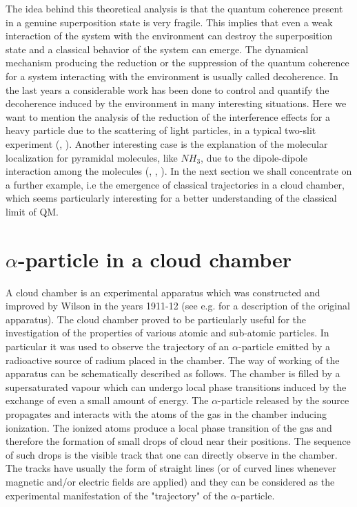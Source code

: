 \documentclass[12pt,reqno]{amsart}
\newcommand{\n}{\relax}
\newcommand{\vs}{\medskip}
\numberwithin{equation}{section}
\begin{document}
\n
The idea behind this theoretical analysis is that the quantum coherence  present in a genuine superposition state is very fragile. This implies that even a weak interaction of the system with the environment can destroy the superposition state and a classical behavior of the system can emerge. The dynamical mechanism producing the reduction or the suppression of the quantum coherence for a system interacting with the environment is usually called decoherence. In the last years a considerable work has been done to control and quantify the decoherence induced by the environment in many interesting situations. Here we want to  mention the analysis of the reduction of the interference effects for a heavy particle due to the scattering of light particles, in a typical  two-slit experiment (\cite{jz}, \cite{hs}). Another  interesting case is the explanation of the molecular localization for  pyramidal molecules, like $NH_3$, due to the dipole-dipole interaction among the molecules (\cite{cj}, \cite{jpt}, \cite{gms}). 
In the next section we shall concentrate on a further example, i.e the emergence of classical trajectories in a cloud chamber, which seems particularly interesting for a better understanding of the classical limit of QM.







\vs

\vs
\section{$\alpha$-particle in a cloud chamber}

\vs
\n
A cloud chamber is an experimental apparatus which was constructed and improved by Wilson in the years 1911-12 (see e.g. \cite{lr} for a description of the original apparatus). The cloud chamber proved to be particularly useful for the investigation of the properties of  various atomic and sub-atomic particles. %
In particular it was used to observe the trajectory of an $\alpha$-particle emitted by a radioactive source of radium placed in the chamber. The way of working  of the apparatus can be schematically described as follows. The chamber is filled by a supersaturated  vapour which can undergo local phase transitions induced by the exchange of even  a small amount  of  energy. The $\alpha$-particle released  by the source propagates   and interacts with the atoms of the gas in the chamber inducing ionization. The ionized atoms  produce a local phase transition of the gas  and therefore the formation of small drops of cloud near their positions. The sequence of such drops is the visible track that one can directly observe in the chamber. The tracks have usually the form of straight lines (or of curved lines whenever  magnetic and/or electric  fields are  applied) and they can be considered as the experimental manifestation of the "trajectory" of the $\alpha$-particle. 
\end{document}
